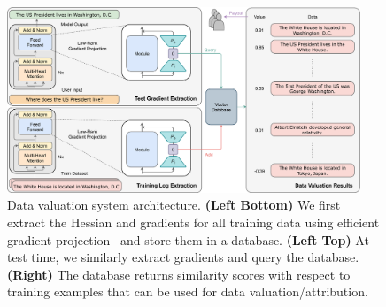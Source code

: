 \begin{figure}
    \centering
    \includegraphics[width=0.94\textwidth]{figures/diagram_v7.pdf}
    \vskip -4pt
    \caption{Data valuation system architecture. \textbf{(Left Bottom)} We first extract the Hessian and gradients for all training data using efficient gradient projection \method\ and store them in a database. \textbf{(Left Top)} At test time, we similarly extract gradients and query the database. \textbf{(Right)} The database returns similarity scores with respect to training examples that can be used for data valuation/attribution.}
    \label{fig:diagram}
\end{figure}

